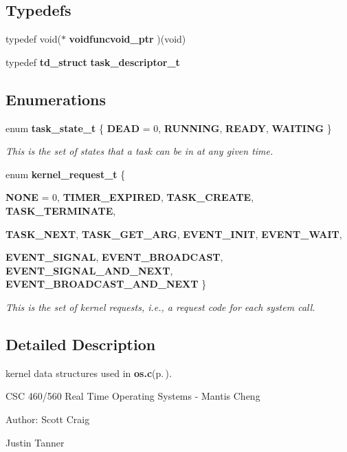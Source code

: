 \subsection*{Typedefs}
\begin{CompactItemize}
\item 
typedef void($\ast$ {\bf voidfuncvoid\_\-ptr} )(void)
\item 
typedef {\bf td\_\-struct} {\bf task\_\-descriptor\_\-t}
\end{CompactItemize}
\subsection*{Enumerations}
\begin{CompactItemize}
\item 
enum {\bf task\_\-state\_\-t} \{ {\bf DEAD} =  0, 
{\bf RUNNING}, 
{\bf READY}, 
{\bf WAITING}
 \}
\begin{CompactList}\small\item\em This is the set of states that a task can be in at any given time. \item\end{CompactList}\item 
enum {\bf kernel\_\-request\_\-t} \{ \par
{\bf NONE} =  0, 
{\bf TIMER\_\-EXPIRED}, 
{\bf TASK\_\-CREATE}, 
{\bf TASK\_\-TERMINATE}, 
\par
{\bf TASK\_\-NEXT}, 
{\bf TASK\_\-GET\_\-ARG}, 
{\bf EVENT\_\-INIT}, 
{\bf EVENT\_\-WAIT}, 
\par
{\bf EVENT\_\-SIGNAL}, 
{\bf EVENT\_\-BROADCAST}, 
{\bf EVENT\_\-SIGNAL\_\-AND\_\-NEXT}, 
{\bf EVENT\_\-BROADCAST\_\-AND\_\-NEXT}
 \}
\begin{CompactList}\small\item\em This is the set of kernel requests, i.e., a request code for each system call. \item\end{CompactList}\end{CompactItemize}


\subsection{Detailed Description}
kernel data structures used in {\bf os.c}{\rm (p.\,\pageref{os_8c})}. 

CSC 460/560 Real Time Operating Systems - Mantis Cheng

\begin{Desc}
\item[Author:]Scott Craig 

Justin Tanner \end{Desc}


